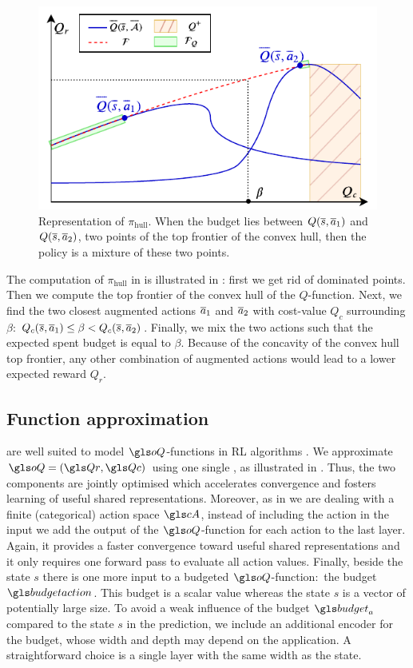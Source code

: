 \begin{figure}[t]
	\centering
	\includegraphics[width=0.6\linewidth]{img/pi.pdf}
	\caption{Representation of $\pi_\text{hull}$. When the budget lies between $Q(\overline{s},\overline{a}_1)$ and $Q(\overline{s},\overline{a}_2)$, two points of the top frontier of the convex hull, then the policy is a mixture of these two points.}
	\label{fig:hull}
\end{figure}

The computation of $\pi_\text{hull}$ in  is illustrated in : first we get rid of dominated points. Then we compute the top frontier of the convex hull of the $Q$-function. Next, we find the two closest augmented actions $\overline{a}_1$ and $\overline{a}_2$ with cost-value $Q_c$ surrounding $\beta$:  $Q_c(\overline{s},\overline{a}_1)\leq\beta<Q_c(\overline{s},\overline{a}_2)$. Finally, we mix the two actions such that the expected spent budget is equal to $\beta$. Because of the concavity of the convex hull top frontier, any other combination of augmented actions would lead to a lower expected reward $Q_r$. 




\subsection{Function approximation}

 are well suited to model $\oQ$-functions in \gls{RL} algorithms \citep{Mnih2015humanlevel}. We approximate $\oQ = (\Qr, \Qc)$ using one single , as illustrated in . Thus, the two components are jointly optimised which accelerates convergence and fosters learning of useful shared representations. Moreover, as in \citep{Mnih2015humanlevel} we are dealing with a finite (categorical) action space $\cA$, instead of including the action in the input we add the output of the $\oQ$-function for each action to the last layer. Again, it provides a faster convergence toward useful shared representations and it only requires one forward pass to evaluate all action values. Finally, beside the state $s$ there is one more input to a budgeted $\oQ$-function:~the budget $\budgetaction$. This budget is a scalar value whereas the state $s$ is a vector of potentially large size. To avoid a weak influence of the budget $\budget_a$ compared to the state $s$ in the prediction, we include an additional encoder for the budget, whose width and depth may depend on the application. A straightforward choice is a single layer with the same width as the state.

